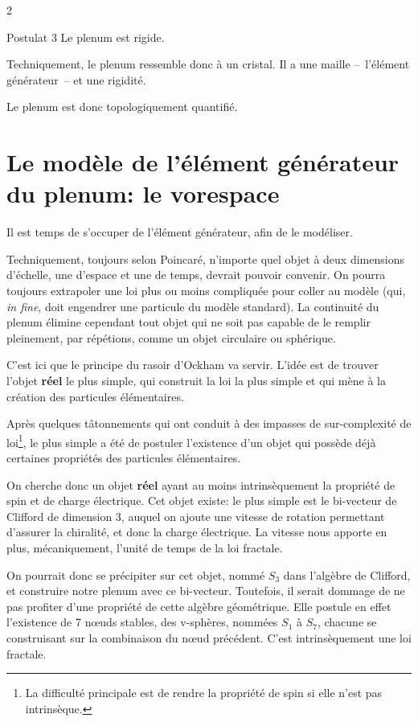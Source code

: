 \begin{multicols}{2}
\begin{mybox}[breakable,colback=blue!10, colbacktitle=pkcolor]{Postulat 3}
Le plenum est rigide.
\end{mybox}
\medskip

Techniquement, le plenum ressemble donc à un cristal. Il a une maille
--~l'élément générateur~-- et une rigidité.

Le plenum est donc topologiquement quantifié.

\section{Le modèle de l'élément générateur du plenum: le vorespace}
	
Il est temps de s'occuper de l'élément générateur, afin de
le modéliser.

Techniquement, toujours selon Poincaré, n'importe quel objet à deux dimensions
d'échelle, une d'espace et une de temps, devrait pouvoir convenir. On
pourra toujours extrapoler une loi plus ou moins compliquée
pour coller au modèle (qui, \textit{in fine}, doit engendrer une particule du
modèle standard). La continuité du plenum élimine cependant tout objet
qui ne soit pas capable de le remplir pleinement, par répétions, comme
un objet circulaire ou sphérique.

C'est ici que le principe du rasoir d'Ockham va servir. L'idée est de trouver
l'objet \textbf{réel} le plus simple, qui construit la loi la plus simple et
qui mène à la création des particules élémentaires.

Après quelques tâtonnements qui ont conduit à des impasses de
sur-complexité de loi\footnote{La difficulté principale est de rendre
la propriété de spin si elle n'est pas intrinsèque.}, le plus simple a
été de postuler l'existence d'un objet qui possède déjà certaines
propriétés des particules élémentaires.

On cherche donc un objet \textbf{réel} ayant au moins intrinsèquement la
propriété de spin et de charge électrique. Cet objet existe: le plus
simple est le bi-vecteur de Clifford de dimension 3, auquel on ajoute
une vitesse de rotation permettant d'assurer la chiralité, et donc la
charge électrique. La vitesse nous apporte en plus, mécaniquement,
l'unité de temps de la loi fractale.

On pourrait donc se précipiter sur cet objet, nommé $S_3$ dans l'algèbre
de Clifford, et construire notre plenum avec ce bi-vecteur. Toutefois, il serait
dommage de ne pas profiter d'une propriété de cette algèbre
géométrique. Elle postule en effet l'existence de 7 nœuds stables, des
v-sphères, nommées $S_1$ à $S_7$, chacune se construisant sur la
combinaison du nœud précédent. C'est intrinsèquement une loi
fractale. 


\end{multicols}
